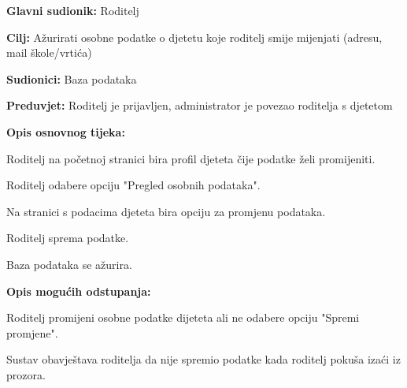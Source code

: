 					\noindent {}
					\begin{packed_item}
						
						\item \textbf{Glavni sudionik: }Roditelj
						\item  \textbf{Cilj:} Ažurirati osobne podatke o djetetu koje roditelj smije mijenjati (adresu, mail škole/vrtića)
						\item  \textbf{Sudionici:} Baza podataka
						\item  \textbf{Preduvjet:} Roditelj je prijavljen, administrator je povezao roditelja s djetetom
						\item  \textbf{Opis osnovnog tijeka:}
						
						\item[] \begin{packed_enum}
							
							\item Roditelj na početnoj stranici bira profil djeteta čije podatke želi promijeniti. 
							\item Roditelj odabere opciju "Pregled osobnih podataka".
							\item Na stranici s podacima djeteta bira opciju za promjenu podataka.
							\item Roditelj sprema podatke.
							\item Baza podataka se ažurira.
						\end{packed_enum}
						
						\item  \textbf{Opis mogućih odstupanja:}
						
						\item[] \begin{packed_item}
							
							\item[4.a] Roditelj promijeni osobne podatke dijeteta ali ne odabere opciju "Spremi promjene".
							\item[] \begin{packed_enum}
								
								\item Sustav obavještava roditelja da nije spremio podatke kada roditelj pokuša izaći iz prozora.
							\end{packed_enum}
							
						\end{packed_item}
					\end{packed_item}
					
